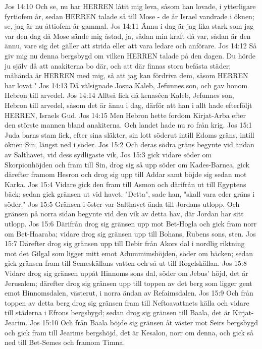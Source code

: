 Jos 14:10  Och se, nu har HERREN låtit mig leva, såsom han lovade, i ytterligare fyrtiofem år, sedan HERREN talade så till Mose - de år Israel vandrade i öknen; se, jag är nu åttiofem år gammal.
Jos 14:11  Ännu i dag är jag lika stark som jag var den dag då Mose sände mig åstad, ja, sådan min kraft då var, sådan är den ännu, vare sig det gäller att strida eller att vara ledare och anförare.
Jos 14:12  Så giv mig nu denna bergsbygd om vilken HERREN talade på den dagen. Du hörde ju själv då att anakiterna bo där, och att där finnas stora befästa städer; måhända är HERREN med mig, så att jag kan fördriva dem, såsom HERREN har lovat."
Jos 14:13  Då välsignade Josua Kaleb, Jefunnes son, och gav honom Hebron till arvedel.
Jos 14:14  Alltså fick då kenaséen Kaleb, Jefunnes son, Hebron till arvedel, såsom det är ännu i dag, därför att han i allt hade efterföljt HERREN, Israels Gud.
Jos 14:15  Men Hebron hette fordom Kirjat-Arba efter den störste mannen bland anakiterna. Och landet hade nu ro från krig.
Jos 15:1  Juda barns stam fick, efter sina släkter, sin lott söderut intill Edoms gräns, intill öknen Sin, längst ned i söder.
Jos 15:2  Och deras södra gräns begynte vid ändan av Salthavet, vid dess sydligaste vik,
Jos 15:3  gick vidare söder om Skorpionhöjden och fram till Sin, drog sig så upp söder om Kades-Barnea, gick därefter framom Hesron och drog sig upp till Addar samt böjde sig sedan mot Karka.
Jos 15:4  Vidare gick den fram till Asmon och därifrån ut till Egyptens bäck; sedan gick gränsen ut vid havet. "Detta", sade han, "skall vara eder gräns i söder."
Jos 15:5  Gränsen i öster var Salthavet ända till Jordans utlopp. Och gränsen på norra sidan begynte vid den vik av detta hav, där Jordan har sitt utlopp.
Jos 15:6  Därifrån drog sig gränsen upp mot Bet-Hogla och gick fram norr om Bet-Haaraba; vidare drog sig gränsen upp till Bohans, Rubens sons, sten.
Jos 15:7  Därefter drog sig gränsen upp till Debir från Akors dal i nordlig riktning mot det Gilgal som ligger mitt emot Adummimshöjden, söder om bäcken; sedan gick gränsen fram till Semeskällans vatten och så ut till Rogelskällan.
Jos 15:8  Vidare drog sig gränsen uppåt Hinnoms sons dal, söder om Jebus' höjd, det är Jerusalem; därefter drog sig gränsen upp till toppen av det berg som ligger gent emot Hinnomsdalen, västerut, i norra ändan av Refaimsdalen.
Jos 15:9  Och från toppen av detta berg drog sig gränsen fram till Neftoavattnets källa och vidare till städerna i Efrons bergsbygd; sedan drog sig gränsen till Baala, det är Kirjat-Jearim.
Jos 15:10  Och från Baala böjde sig gränsen åt väster mot Seirs bergsbygd och gick fram till Jearims bergshöjd, det är Kesalon, norr om denna, och gick så ned till Bet-Semes och framom Timna.
